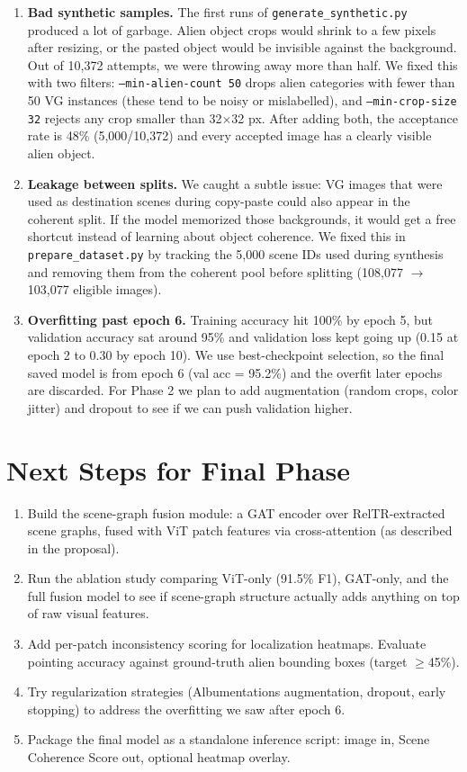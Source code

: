 \documentclass[10pt,a4paper]{article}
\begin{document}
\begin{enumerate}[itemsep=10pt,leftmargin=1.5em]
    \item \textbf{Bad synthetic samples.} The first runs of \texttt{generate\_synthetic.py} produced a lot of garbage. Alien object crops would shrink to a few pixels after resizing, or the pasted object would be invisible against the background. Out of 10,372 attempts, we were throwing away more than half. We fixed this with two filters: \texttt{--min-alien-count 50} drops alien categories with fewer than 50 VG instances (these tend to be noisy or mislabelled), and \texttt{--min-crop-size 32} rejects any crop smaller than 32$\times$32 px. After adding both, the acceptance rate is 48\% (5,000/10,372) and every accepted image has a clearly visible alien object.

    \item \textbf{Leakage between splits.} We caught a subtle issue: VG images that were used as destination scenes during copy-paste could also appear in the coherent split. If the model memorized those backgrounds, it would get a free shortcut instead of learning about object coherence. We fixed this in \texttt{prepare\_dataset.py} by tracking the 5,000 scene IDs used during synthesis and removing them from the coherent pool before splitting (108,077 $\to$ 103,077 eligible images).

    \item \textbf{Overfitting past epoch 6.} Training accuracy hit 100\% by epoch 5, but validation accuracy sat around 95\% and validation loss kept going up (0.15 at epoch 2 to 0.30 by epoch 10). We use best-checkpoint selection, so the final saved model is from epoch 6 (val acc = 95.2\%) and the overfit later epochs are discarded. For Phase 2 we plan to add augmentation (random crops, color jitter) and dropout to see if we can push validation higher.
\end{enumerate}

\section{Next Steps for Final Phase}

\begin{enumerate}[itemsep=10pt,leftmargin=1.5em]
    \item Build the scene-graph fusion module: a GAT encoder over RelTR-extracted scene graphs, fused with ViT patch features via cross-attention (as described in the proposal).
    \item Run the ablation study comparing ViT-only (91.5\% F1), GAT-only, and the full fusion model to see if scene-graph structure actually adds anything on top of raw visual features.
    \item Add per-patch inconsistency scoring for localization heatmaps. Evaluate pointing accuracy against ground-truth alien bounding boxes (target $\geq$45\%).
    \item Try regularization strategies (Albumentations augmentation, dropout, early stopping) to address the overfitting we saw after epoch 6.
    \item Package the final model as a standalone inference script: image in, Scene Coherence Score out, optional heatmap overlay.
\end{enumerate}
\end{document}
